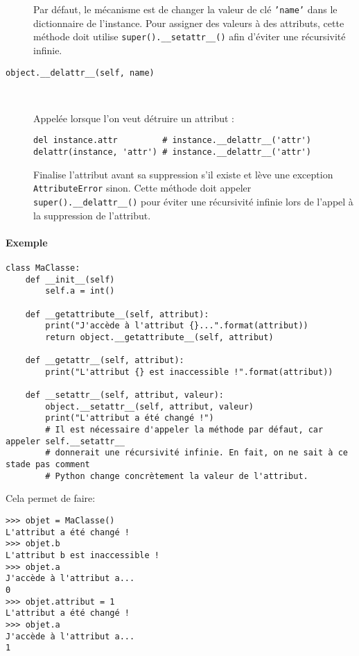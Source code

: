 \begin{description}
    Par défaut, le mécanisme est de changer la valeur de clé \texttt{'name'} dans le dictionnaire de l'instance. Pour assigner des valeurs à des attributs, cette méthode doit utilise \texttt{super().__setattr__()} afin d'éviter une récursivité infinie.

    \item[\texttt{object.__delattr__(self, name)}]~

    Appelée lorsque l'on veut détruire un attribut : 
    \begin{verbatim}
del instance.attr         # instance.__delattr__('attr')
delattr(instance, 'attr') # instance.__delattr__('attr')
    \end{verbatim}
    
    Finalise l'attribut avant sa suppression s'il existe et lève une exception \texttt{AttributeError} sinon. Cette méthode doit appeler \texttt{super().__delattr__()} pour éviter une récursivité infinie lors de l'appel à la suppression de l'attribut.
\end{description}  


\paragraph{Exemple}
\begin{verbatim}
class MaClasse:
    def __init__(self)
        self.a = int()

    def __getattribute__(self, attribut):
        print("J'accède à l'attribut {}...".format(attribut))
        return object.__getattribute__(self, attribut)

    def __getattr__(self, attribut):
        print("L'attribut {} est inaccessible !".format(attribut))

    def __setattr__(self, attribut, valeur):
        object.__setattr__(self, attribut, valeur)
        print("L'attribut a été changé !")
        # Il est nécessaire d'appeler la méthode par défaut, car appeler self.__setattr__
        # donnerait une récursivité infinie. En fait, on ne sait à ce stade pas comment
        # Python change concrètement la valeur de l'attribut.
\end{verbatim}

Cela permet de faire:
\begin{verbatim}
>>> objet = MaClasse()
L'attribut a été changé !
>>> objet.b
L'attribut b est inaccessible !
>>> objet.a
J'accède à l'attribut a...
0
>>> objet.attribut = 1
L'attribut a été changé !
>>> objet.a
J'accède à l'attribut a...
1
\end{verbatim}

